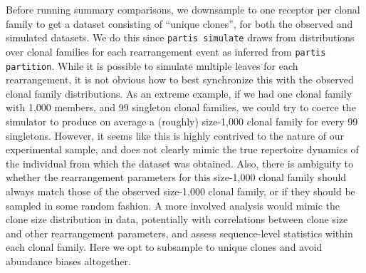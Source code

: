 \documentclass{article}
\begin{document}
Before running summary comparisons, we downsample to one receptor per clonal family to get a dataset consisting of ``unique clones'', for both the observed and simulated datasets.
We do this since \texttt{partis simulate} draws from distributions over clonal families for each rearrangement event as inferred from \texttt{partis partition}.
While it is possible to simulate multiple leaves for each rearrangement, it is not obvious how to best synchronize this with the observed clonal family distributions.
As an extreme example, if we had one clonal family with 1,000 members, and 99 singleton clonal families, we could try to coerce the simulator to produce on average a (roughly) size-1,000 clonal family for every 99 singletons.
However, it seems like this is highly contrived to the nature of our experimental sample, and does not clearly mimic the true repertoire dynamics of the individual from which the dataset was obtained.
Also, there is ambiguity to whether the rearrangement parameters for this size-1,000 clonal family should always match those of the observed size-1,000 clonal family, or if they should be sampled in some random fashion.
A more involved analysis would mimic the clone size distribution in data, potentially with correlations between clone size and other rearrangement parameters, and assess sequence-level statistics within each clonal family.
Here we opt to subsample to unique clones and avoid abundance biases altogether.
\end{document}
